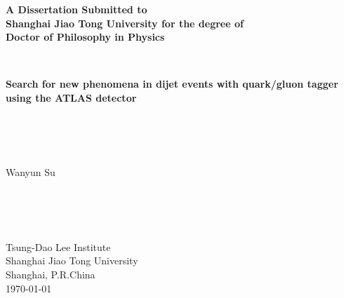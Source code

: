 \documentclass[UTF8,12pt]{ctexart}
\numberwithin{equation}{section}
\newcommand{\red}{\color{red}}
\begin{document}
	\linenumbers
	\thispagestyle{empty}
	
	\renewcommand{\headrulewidth}{0pt}
	\begin{figure}[htb] 
	\end{figure}
	
	
	
	\begin{center}
		\textbf{
			A Dissertation Submitted to \\
			Shanghai Jiao Tong University for the degree of \\
			Doctor of Philosophy in Physics}
	\end{center}
	~\\
	\begin{center}
		\textbf{
			Search for new phenomena in dijet events with quark/gluon tagger using the ATLAS detector}
	\end{center}
	~\\
	~\\
	~\\
	\begin{center}
		Wanyun Su\\
	\end{center}
	~\\
	~\\
	~\\
	\begin{center}
		Tsung-Dao Lee Institute\\ %
		Shanghai Jiao Tong University \\
		Shanghai, P.R.China \\
		\today
	\end{center}
	
	
	\newpage
	\thispagestyle{empty}
	~\\
	
\end{document}
